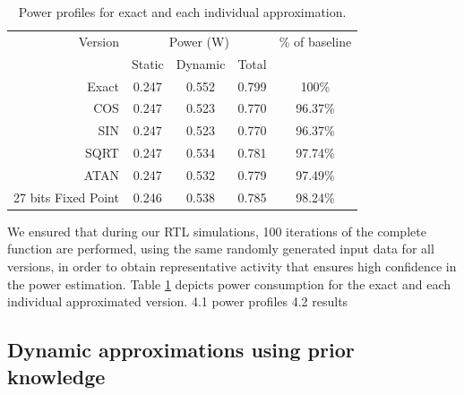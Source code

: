\begin{table}[h]
\begin{tabular}{r c c c c}
\toprule
Version & \multicolumn{3}{c}{Power (W)} & \% of baseline\\
 & Static & Dynamic & Total &\\
\hline
Exact & 0.247 & 0.552 & 0.799 & 100\%\\
COS & 0.247 & 0.523 & 0.770 & 96.37\%\\
SIN & 0.247 & 0.523 & 0.770 & 96.37\%\\
SQRT & 0.247 & 0.534 & 0.781 & 97.74\%\\
ATAN & 0.247 & 0.532 & 0.779 & 97.49\%\\
27 bits Fixed Point & 0.246 & 0.538 & 0.785 & 98.24\%\\
\hline
\end{tabular}
\caption{Power profiles for exact and each individual approximation.}
\label{table:power_profiles}
\end{table}


\par We ensured that during our RTL simulations, 100 iterations of the complete function are performed, using the same randomly generated input data for all versions, in order to obtain representative activity that ensures high confidence in the power estimation. Table \ref{table:power_profiles} depicts power consumption for the exact and each individual approximated version.
4.1 power profiles
4.2 results



\subsection{Dynamic approximations using prior knowledge}

